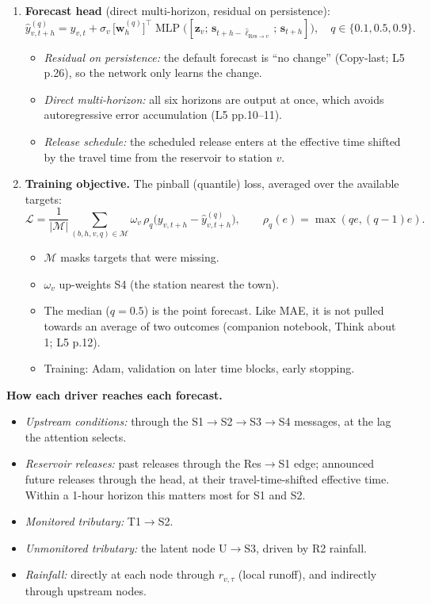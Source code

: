 \documentclass[11pt]{article}
\begin{document}
\begin{enumerate}[label=(\alph*)]
\item \textbf{Forecast head} (direct multi-horizon, residual on persistence):
\[ \hat y_{v,t+h}^{(q)} = y_{v,t} + \sigma_v\,\big[\mathbf{w}^{(q)}_{h}\big]^{\!\top}\operatorname{MLP}\big([\mathbf{z}_v;\, \mathbf{s}_{t+h-\hat\ell_{\text{Res}\to v}}\,;\, \mathbf{s}_{t+h}]\big),\quad q\in\{0.1,0.5,0.9\}. \]
\begin{itemize}
  \item \emph{Residual on persistence:} the default forecast is ``no change'' (Copy-last; L5 p.26), so the network only learns the change.
  \item \emph{Direct multi-horizon:} all six horizons are output at once, which avoids autoregressive error accumulation (L5 pp.10--11).
  \item \emph{Release schedule:} the scheduled release enters at the effective time shifted by the travel time from the reservoir to station $v$.
\end{itemize}

\item \textbf{Training objective.} The pinball (quantile) loss, averaged over the available targets:
\[ \mathcal{L}=\frac{1}{|\mathcal{M}|}\sum_{(b,h,v,q)\in\mathcal{M}} \omega_v\,\rho_q\big(y_{v,t+h}-\hat y^{(q)}_{v,t+h}\big),\qquad \rho_q(e)=\max(qe,(q-1)e). \]
\begin{itemize}
  \item $\mathcal{M}$ masks targets that were missing.
  \item $\omega_v$ up-weights S4 (the station nearest the town).
  \item The median ($q=0.5$) is the point forecast. Like MAE, it is not pulled towards an average of two outcomes (companion notebook, Think about 1; L5 p.12).
  \item Training: Adam, validation on later time blocks, early stopping.
\end{itemize}
\end{enumerate}

\noindent\textbf{How each driver reaches each forecast.}
\begin{itemize}
\item \emph{Upstream conditions:} through the S1$\to$S2$\to$S3$\to$S4 messages, at the lag the attention selects.
\item \emph{Reservoir releases:} past releases through the Res$\to$S1 edge; announced future releases through the head, at their travel-time-shifted effective time. Within a 1-hour horizon this matters most for S1 and S2.
\item \emph{Monitored tributary:} T1$\to$S2.
\item \emph{Unmonitored tributary:} the latent node U$\to$S3, driven by R2 rainfall.
\item \emph{Rainfall:} directly at each node through $r_{v,\tau}$ (local runoff), and indirectly through upstream nodes.
\end{itemize}
\end{document}
